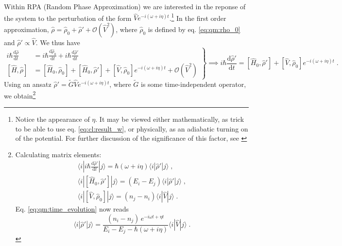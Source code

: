 \documentclass[a4paper,12pt]{article}
\begin{document}
    Within RPA (Random Phase Approximation) we are interested in the reponse of the system to the perturbation of the form $\hat V e^{-i(\omega + i\eta) t}$.\footnote{Notice the appearance of $\eta$. It may be viewed either mathematically, as trick to be able to use eq. \ref{eq:cl:result_w}, or physically, as an adiabatic turning on of the potential. For further discussion of the significance of this factor, see \cite{1972causality}} In the first order approximation, $\hat\rho = \hat\rho_0 + \hat\rho' + \mathcal{O}(\hat V^2)$, where $\hat\rho_0$ is defined by eq. \eqref{eq:qm:rho_0} and $\hat\rho' \propto \hat V$. We thus have
    \begin{equation} \label{eq:qm:time_evolution}
        \left.
        \begin{aligned}
            i\hbar \frac{\text{d}\hat\rho}{\text{d}t} &= i\hbar \frac{\text{d}\hat\rho_0}{\text{d}t} + i\hbar\frac{\text{d}\hat\rho'}{\text{d}t} \\
            [\hat H, \hat\rho] &= [\hat H_0, \hat \rho_0] + [\hat H_0, \hat \rho'] + [\hat V, \hat \rho_0] e^{-i (\omega + i\eta) t} + \mathcal{O}(\hat V^2)
        \end{aligned} \right\} \implies
        i\hbar \frac{\text{d}\hat\rho'}{\text{d}t} = [\hat H_0, \hat \rho'] + [\hat V, \hat \rho_0] e^{-i (\omega + i\eta) t}\; .
    \end{equation}
    Using an ansatz $\hat\rho' = \widetilde G \hat V e^{-i (\omega + i\eta) t}$, where $\widetilde G$ is some time-independent operator, we obtain\footnote{ %
    Calculating matrix elements:
    \begin{equation*}
    \begin{gathered}
        \langle i | i\hbar \frac{\text{d}\hat\rho'}{\text{d}t} | j \rangle = 
            \hbar(\omega + i\eta)\langle i| \hat\rho' | j \rangle\; , \\
        \langle i | [\hat H_0, \hat\rho'] | j \rangle = (E_i - E_j) \langle i| \hat\rho' | j \rangle\; , \\
        \langle i | [\hat V, \hat\rho_0] | j \rangle = (n_j - n_i) \langle i| \hat V | j \rangle\; .
    \end{gathered}
    \end{equation*}
    Eq. \eqref{eq:qm:time_evolution} now reads
    \begin{equation*}
         \langle i| \hat\rho' |j\rangle =
            \frac{(n_i - n_j)\, e^{-i\omega t + \eta t}}{E_i - E_j - \hbar(\omega + i\eta)} \langle i| \hat V |j \rangle \; .
    \end{equation*}
} %
\end{document}
